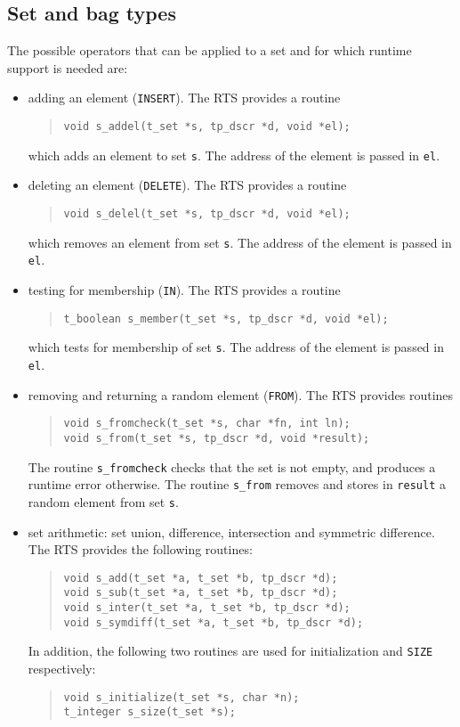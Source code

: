 \documentclass[10pt]{article}
\begin{document}
\subsection{Set and bag types}
The possible operators that can be applied to a set and for which runtime
support is needed are:
\begin{itemize}
\item
adding an element (\verb+INSERT+).
The RTS provides a routine
\begin{quote}
\begin{verbatim}
void s_addel(t_set *s, tp_dscr *d, void *el);
\end{verbatim}
\end{quote}
which adds an element to set \verb+s+.
The address of the element is passed in \verb+el+.
\item
deleting an element (\verb+DELETE+).
The RTS provides a routine
\begin{quote}
\begin{verbatim}
void s_delel(t_set *s, tp_dscr *d, void *el);
\end{verbatim}
\end{quote}
which removes an element from set \verb+s+.
The address of the element is passed in \verb+el+.
\item
testing for membership (\verb+IN+).
The RTS provides a routine
\begin{quote}
\begin{verbatim}
t_boolean s_member(t_set *s, tp_dscr *d, void *el);
\end{verbatim}
\end{quote}
which tests for membership of set \verb+s+.
The address of the element is passed in \verb+el+.
\item
removing and returning a random element (\verb+FROM+).
The RTS provides routines
\begin{quote}
\begin{verbatim}
void s_fromcheck(t_set *s, char *fn, int ln);
void s_from(t_set *s, tp_dscr *d, void *result);
\end{verbatim}
\end{quote}
The routine \verb+s_fromcheck+ checks that the set is not empty, and
produces a runtime error otherwise.
The routine \verb+s_from+
removes and stores in \verb+result+
a random element
from set \verb+s+.
\item
set arithmetic: set union, difference, intersection and
symmetric difference.
The RTS provides the following routines:
\begin{quote}
\begin{verbatim}
void s_add(t_set *a, t_set *b, tp_dscr *d);
void s_sub(t_set *a, t_set *b, tp_dscr *d);
void s_inter(t_set *a, t_set *b, tp_dscr *d);
void s_symdiff(t_set *a, t_set *b, tp_dscr *d);
\end{verbatim}
\end{quote}
In addition, the following two routines are used for initialization and
\verb+SIZE+ respectively:
\begin{quote}
\begin{verbatim}
void s_initialize(t_set *s, char *n);
t_integer s_size(t_set *s);
\end{verbatim}
\end{quote}
\end{itemize}
\end{document}
